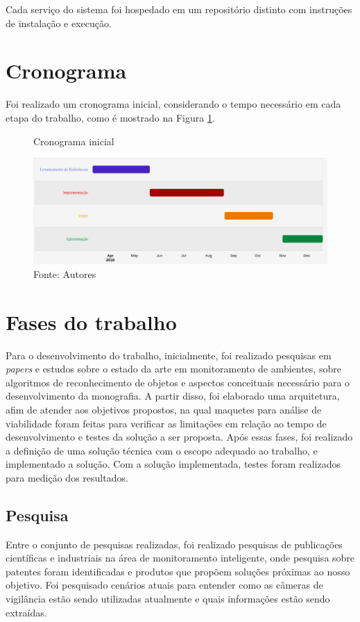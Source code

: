 \documentclass[]{politex}
\begin{document}
Cada serviço do sistema foi hospedado em um repositório distinto com instruções de instalação e execução.

\section{Cronograma}
Foi realizado um cronograma inicial, considerando o tempo necessário em cada etapa do trabalho, como é mostrado na Figura \ref{fig:cronograma}.

\begin{figure}[H]
    \centering
    \caption{Cronograma inicial}
    \includegraphics[width=\textwidth]{metodologia_gantt}
    \caption*{Fonte: Autores}
    \label{fig:cronograma}
\end{figure}

\section{Fases do trabalho}
Para o desenvolvimento do trabalho, inicialmente, foi realizado  pesquisas em \textit{papers} e estudos sobre o estado da arte em monitoramento de ambientes, sobre algoritmos de reconhecimento de objetos e aspectos conceituais necessário para o desenvolvimento da monografia. A partir disso, foi elaborado uma arquitetura, afim de atender aos objetivos propostos, na qual maquetes para análise de viabilidade foram feitas para verificar as limitações em relação ao tempo de desenvolvimento e testes da solução a ser proposta. Após essas fases, foi realizado a definição de uma solução técnica com o escopo adequado ao trabalho, e implementado a solução. Com a solução implementada, testes foram realizados para medição dos resultados.

\subsection{Pesquisa}
Entre o conjunto de pesquisas realizadas, foi realizado pesquisas de publicações científicas e industriais na área de monitoramento inteligente, onde pesquisa sobre patentes foram identificadas e produtos que propõem soluções próximas ao nosso objetivo. Foi pesquisado cenários atuais para entender como as câmeras de vigilância estão sendo utilizadas atualmente e quais informações estão sendo extraídas.
\end{document}
